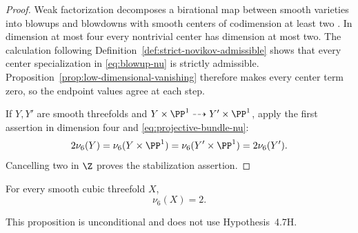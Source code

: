 \begin{proof}
Weak factorization decomposes a birational map between smooth varieties into
blowups and blowdowns with smooth centers of codimension at least two
\cite{AKMW}.  In dimension at most four every nontrivial center has dimension
at most two.  The calculation following
Definition~\ref{def:strict-novikov-admissible} shows that every center
specialization in \eqref{eq:blowup-nu} is strictly admissible.
Proposition~\ref{prop:low-dimensional-vanishing} therefore makes every center
term zero, so the endpoint values agree at each step.

If \(Y,Y'\) are smooth threefolds and
\(Y\times\PP^1\dashrightarrow Y'\times\PP^1\), apply the first assertion in
dimension four and \eqref{eq:projective-bundle-nu}:
\[
 2\nu_6(Y)=\nu_6(Y\times\PP^1)
 =\nu_6(Y'\times\PP^1)=2\nu_6(Y').
\]
Cancelling two in \(\Z\) proves the stabilization assertion.
\end{proof}

\begin{proposition}
\label{prop:cubic-packet}
For every smooth cubic threefold \(X\),
\[
 \nu_6(X)=2.
 \tag{4.9}
 \label{eq:cubic-packet-value}
\]
\end{proposition}

This proposition is unconditional and does not use Hypothesis~4.7H.

